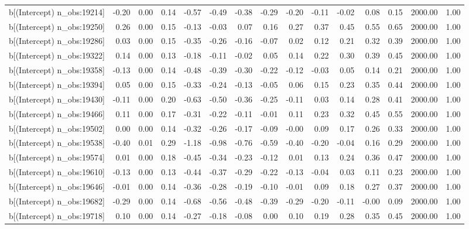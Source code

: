 \begin{table}[ht]
\begin{tabular}{rrrrrrrrrrrrrrr}
  b[(Intercept) n\_obs:19214] & -0.20 & 0.00 & 0.14 & -0.57 & -0.49 & -0.38 & -0.29 & -0.20 & -0.11 & -0.02 & 0.08 & 0.15 & 2000.00 & 1.00 \\ 
  b[(Intercept) n\_obs:19250] & 0.26 & 0.00 & 0.15 & -0.13 & -0.03 & 0.07 & 0.16 & 0.27 & 0.37 & 0.45 & 0.55 & 0.65 & 2000.00 & 1.00 \\ 
  b[(Intercept) n\_obs:19286] & 0.03 & 0.00 & 0.15 & -0.35 & -0.26 & -0.16 & -0.07 & 0.02 & 0.12 & 0.21 & 0.32 & 0.39 & 2000.00 & 1.00 \\ 
  b[(Intercept) n\_obs:19322] & 0.14 & 0.00 & 0.13 & -0.18 & -0.11 & -0.02 & 0.05 & 0.14 & 0.22 & 0.30 & 0.39 & 0.45 & 2000.00 & 1.00 \\ 
  b[(Intercept) n\_obs:19358] & -0.13 & 0.00 & 0.14 & -0.48 & -0.39 & -0.30 & -0.22 & -0.12 & -0.03 & 0.05 & 0.14 & 0.21 & 2000.00 & 1.00 \\ 
  b[(Intercept) n\_obs:19394] & 0.05 & 0.00 & 0.15 & -0.33 & -0.24 & -0.13 & -0.05 & 0.06 & 0.15 & 0.23 & 0.35 & 0.44 & 2000.00 & 1.00 \\ 
  b[(Intercept) n\_obs:19430] & -0.11 & 0.00 & 0.20 & -0.63 & -0.50 & -0.36 & -0.25 & -0.11 & 0.03 & 0.14 & 0.28 & 0.41 & 2000.00 & 1.00 \\ 
  b[(Intercept) n\_obs:19466] & 0.11 & 0.00 & 0.17 & -0.31 & -0.22 & -0.11 & -0.01 & 0.11 & 0.23 & 0.32 & 0.45 & 0.55 & 2000.00 & 1.00 \\ 
  b[(Intercept) n\_obs:19502] & 0.00 & 0.00 & 0.14 & -0.32 & -0.26 & -0.17 & -0.09 & -0.00 & 0.09 & 0.17 & 0.26 & 0.33 & 2000.00 & 1.00 \\ 
  b[(Intercept) n\_obs:19538] & -0.40 & 0.01 & 0.29 & -1.18 & -0.98 & -0.76 & -0.59 & -0.40 & -0.20 & -0.04 & 0.16 & 0.29 & 2000.00 & 1.00 \\ 
  b[(Intercept) n\_obs:19574] & 0.01 & 0.00 & 0.18 & -0.45 & -0.34 & -0.23 & -0.12 & 0.01 & 0.13 & 0.24 & 0.36 & 0.47 & 2000.00 & 1.00 \\ 
  b[(Intercept) n\_obs:19610] & -0.13 & 0.00 & 0.13 & -0.44 & -0.37 & -0.29 & -0.22 & -0.13 & -0.04 & 0.03 & 0.11 & 0.23 & 2000.00 & 1.00 \\ 
  b[(Intercept) n\_obs:19646] & -0.01 & 0.00 & 0.14 & -0.36 & -0.28 & -0.19 & -0.10 & -0.01 & 0.09 & 0.18 & 0.27 & 0.37 & 2000.00 & 1.00 \\ 
  b[(Intercept) n\_obs:19682] & -0.29 & 0.00 & 0.14 & -0.68 & -0.56 & -0.48 & -0.39 & -0.29 & -0.20 & -0.11 & -0.00 & 0.09 & 2000.00 & 1.00 \\ 
  b[(Intercept) n\_obs:19718] & 0.10 & 0.00 & 0.14 & -0.27 & -0.18 & -0.08 & 0.00 & 0.10 & 0.19 & 0.28 & 0.35 & 0.45 & 2000.00 & 1.00 \\ 

\end{tabular}
\end{table}
